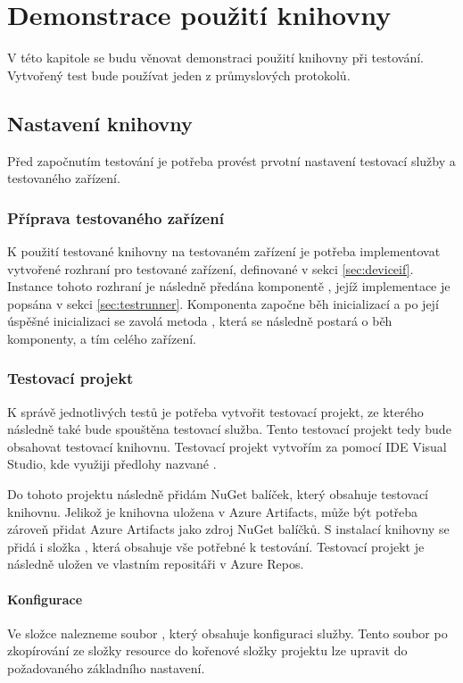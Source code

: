 \chapter{Demonstrace použití knihovny}\label{chap:demonstration}

V této kapitole se budu věnovat demonstraci použití knihovny při testování. Vytvořený test bude používat jeden z průmyslových protokolů.

\section{Nastavení knihovny}
Před započnutím testování je potřeba provést prvotní nastavení testovací služby a testovaného zařízení.

\subsection{Příprava testovaného zařízení}
K použití testované knihovny na testovaném zařízení je potřeba implementovat vytvořené rozhraní pro testované zařízení, definované v sekci \ref{sec:deviceif}. Instance tohoto rozhraní je následně předána komponentě , jejíž implementace je popsána v sekci \ref{sec:testrunner}. Komponenta  započne běh inicializací a po její úspěšné inicializaci se zavolá metoda , která se následně postará o běh komponenty, a tím celého zařízení.

\subsection{Testovací projekt}
K správě jednotlivých testů je potřeba vytvořit testovací projekt, ze kterého následně také bude spouštěna testovací služba. Tento testovací projekt tedy bude obsahovat testovací knihovnu. Testovací projekt vytvořím za pomocí IDE Visual Studio, kde využiji předlohy nazvané . 

Do tohoto projektu následně přidám NuGet balíček, který obsahuje testovací knihovnu. Jelikož je knihovna uložena v Azure Artifacts, může být potřeba zároveň přidat Azure Artifacts jako zdroj NuGet balíčků. S instalací knihovny se přidá i složka , která obsahuje vše potřebné k testování. Testovací projekt je následně uložen ve vlastním repositáři v Azure Repos.  

\subsubsection{Konfigurace}
Ve složce  nalezneme soubor , který obsahuje konfiguraci služby. Tento soubor po zkopírování ze složky resource do kořenové složky projektu lze upravit do požadovaného základního nastavení. 

